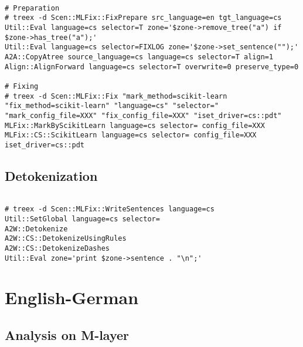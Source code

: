 \begin{lstlisting}

# Preparation
# treex -d Scen::MLFix::FixPrepare src_language=en tgt_language=cs
Util::Eval language=cs selector=T zone='$zone->remove_tree("a") if $zone->has_tree("a");'
Util::Eval language=cs selector=FIXLOG zone='$zone->set_sentence("");'
A2A::CopyAtree source_language=cs language=cs selector=T align=1
Align::AlignForward language=cs selector=T overwrite=0 preserve_type=0

# Fixing
# treex -d Scen::MLFix::Fix "mark_method=scikit-learn "fix_method=scikit-learn" "language=cs" "selector=" "mark_config_file=XXX" "fix_config_file=XXX" "iset_driver=cs::pdt"
MLFix::MarkByScikitLearn language=cs selector= config_file=XXX
MLFix::CS::ScikitLearn language=cs selector= config_file=XXX iset_driver=cs::pdt

\end{lstlisting}

\pagebreak

\subsection{Detokenization}

\begin{lstlisting}

# treex -d Scen::MLFix::WriteSentences language=cs
Util::SetGlobal language=cs selector=
A2W::Detokenize
A2W::CS::DetokenizeUsingRules
A2W::CS::DetokenizeDashes
Util::Eval zone='print $zone->sentence . "\n";'

\end{lstlisting}

\section{English-German}

\subsection{Analysis on M-layer}

